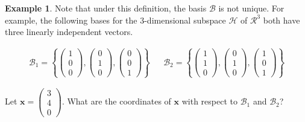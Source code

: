 \documentclass[
]{book}
\theoremstyle{definition}
\theoremstyle{definition}
\newtheorem{example}{Example}[chapter]
\theoremstyle{definition}
\theoremstyle{definition}
\theoremstyle{remark}
\begin{document}
\begin{example}
Note that under this definition, the basis \(\mathcal{B}\) is not unique. For example, the following bases for the 3-dimensional subspace \(\mathcal{H}\) of \(\mathcal{R}^3\) both have three linearly independent vectors.

\[
\begin{aligned}
\mathcal{B}_1 =  \left\{ \begin{pmatrix} 1 \\ 0 \\ 0 \end{pmatrix}, \begin{pmatrix} 0 \\ 1 \\ 0 \end{pmatrix}, \begin{pmatrix} 0 \\ 0 \\ 1 \end{pmatrix} \right\} && \mathcal{B}_2 = \left\{ \begin{pmatrix} 1 \\ 1 \\ 0 \end{pmatrix}, \begin{pmatrix} 0 \\ 1 \\ 0 \end{pmatrix}, \begin{pmatrix} 1 \\ 0 \\ 1 \end{pmatrix} \right\} 
\end{aligned}
\]

Let \(\mathbf{x} = \begin{pmatrix} 3 \\ 4 \\ 0 \end{pmatrix}\). What are the coordinates of \(\mathbf{x}\) with respect to \(\mathcal{B}_1\) and \(\mathcal{B}_2\)?
\end{example}
\end{document}
